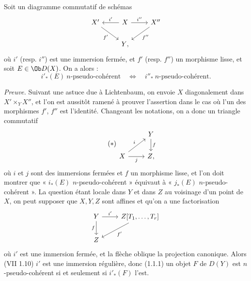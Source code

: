 Soit un diagramme commutatif de schémas
\[
\begin{tikzcd}
X' \arrow[dr,"f'"'] & X \arrow[l,"i'"'] \arrow[r,"i''"] & X'' \arrow[dl,"f''"]\\
& Y{,} &
\end{tikzcd}
\]
où \(i'\) (resp. \(i''\)) est une immersion fermée, et \(f'\) (resp. \(f''\)) un morphisme lisse, et soit \(E\in\Ob D(X)\). On a alors :
\[
  i'_*(E)\ n\text{-pseudo-cohérent}
  \quad\Longleftrightarrow\quad
  i''_*\ n\text{-pseudo-cohérent}.
\]

\emph{Preuve.} Suivant une astuce due à Lichtenbaum, on envoie \(X\) diagonalement dans \(X'\times_YX''\), et l'on est aussitôt ramené à prouver l'assertion dans le cas où l'un des morphismes \(f'\), \(f''\) est l'identité. Changeant les notations, on a donc un triangle commutatif
\begin{equation}\tag{$*$}
\begin{tikzcd}
& Y \arrow[d,"f"]\\
X \arrow[r,"j"'] \arrow[ur,"i"] & Z{,}
\end{tikzcd}
\end{equation}
où \(i\) et \(j\) sont des immersions fermées et \(f\) un morphisme lisse, et l'on doit montrer que « \(i_*(E)\) \(n\)-pseudo-cohérent » équivaut à « \(j_*(E)\) \(n\)-pseudo-cohérent ». La question étant locale dans \(Y\) et dans \(Z\) au voisinage d'un point de \(X\), on peut supposer que \(X,Y,Z\) sont affines et qu'on a une factorisation
\[
\begin{tikzcd}
Y \arrow[r,"i'"] \arrow[d,"f"'] & Z[T_1,\ldots,T_r]\arrow[dl,"f'"]\\
Z&
\end{tikzcd}
\]
où \(i'\) est une immersion fermée, et la flèche oblique la projection canonique. Alors (VII 1.10) \(i'\) est une immersion régulière, donc (1.1.1) un objet \(F\) de \(D(Y)\) est \(n\)-pseudo-cohérent si et seulement si \(i'_*(F)\) l'est.

